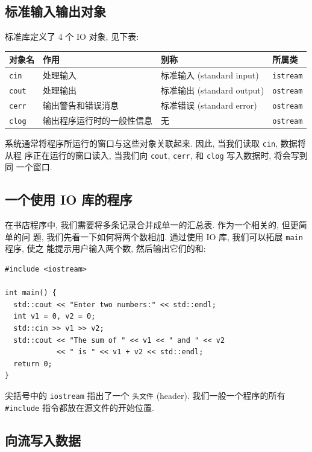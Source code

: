 \documentclass[lang=cn]{elegantbook}
\begin{document}
\subsection{标准输入输出对象}
\label{sec:orge7886fc}

标准库定义了 4 个 IO 对象, 见下表:

\begin{table}[htbp]
\label{4 个 IO 对象}
\centering
\begin{tabular}{llll}
对象名 & 作用 & 别称 & 所属类\\
\hline
\texttt{cin} & 处理输入 & 标准输入 (standard input) & \texttt{istream}\\
\texttt{cout} & 处理输出 & 标准输出 (standard output) & \texttt{ostream}\\
\texttt{cerr} & 输出警告和错误消息 & 标准错误 (standard error) & \texttt{ostream}\\
\texttt{clog} & 输出程序运行时的一般性信息 & 无 & \texttt{ostream}\\
\end{tabular}
\end{table}

系统通常将程序所运行的窗口与这些对象关联起来. 因此, 当我们读取 \texttt{cin}, 数据将从程
序正在运行的窗口读入, 当我们向 \texttt{cout}, \texttt{cerr}, 和 \texttt{clog} 写入数据时, 将会写到同
一个窗口.

\subsection{一个使用 IO 库的程序}
\label{sec:org190748c}

在书店程序中, 我们需要将多条记录合并成单一的汇总表. 作为一个相关的, 但更简单的问
题, 我们先看一下如何将两个数相加. 通过使用 IO 库, 我们可以拓展 \texttt{main} 程序, 使之
能提示用户输入两个数, 然后输出它们的和:

\begin{verbatim}
#include <iostream>

int main() {
  std::cout << "Enter two numbers:" << std::endl;
  int v1 = 0, v2 = 0;
  std::cin >> v1 >> v2;
  std::cout << "The sum of " << v1 << " and " << v2
            << " is " << v1 + v2 << std::endl;
  return 0;
}
\end{verbatim}

尖括号中的 \texttt{iostream} 指出了一个 \texttt{头文件} (header). 我们一般一个程序的所有
\texttt{\#include} 指令都放在源文件的开始位置.

\subsection{向流写入数据}
\label{sec:org36f6c7a}
\end{document}
